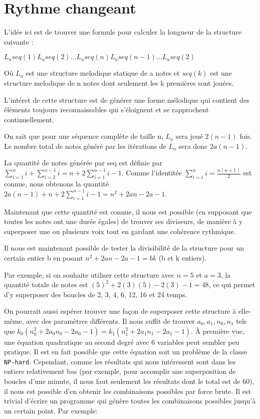 \documentclass{article}
\begin{document}
\section{Rythme changeant}
L'idée ici est de trouver une formule pour calculer la longueur de la structure
suivante :

$L_a seq(1) L_a seq(2) ... L_a seq(n) L_a seq(n-1) ... L_a seq(2)$

Où $L_a$ est une structure melodique statique de a notes et $seq(k)$ est une 
structure melodique de n notes dont seulement les k premières sont jouées.

L'intéret de cette structure est de générer une forme mélodique qui contient
des éléments toujours reconnaissables qui s'éloignent et se rapprochent
continuellement. 

On sait que pour une séquence complète de taille n, $L_a$ sera joué $2(n-1)$ fois.
Le nombre total de notes généré par les itérations de $L_a$ sera donc $2a(n-1)$.

La quantité de notes générée par seq est définie par 
$\sum\limits_{i=1}^n i + \sum\limits_{i=2}^{n-1} i = n + 2\sum\limits_{i=1}^{n-1} i - 1$.
Comme l'identitée $\sum\limits_{i=1}^n i = \frac{n(n+1)}{2}$ est connue, nous
obtenons la quantité $2a(n-1) + n + 2\sum\limits_{i=1}^{n-1} i - 1= n^2 +2an - 2a - 1$.

Maintenant que cette quantité est connue, il  nous est possible (en supposant 
que toutes les notes ont une durée égales) de trouver ses diviseurs, de manière
à y superposer une ou plusieurs voix tout en gardant une cohérence rythmique.

Il nous est maintenant possible de tester la divisibilité de la structure pour
un certain entier b en posant $n^2 + 2an - 2a - 1 = bk$ (b et k entiers). 

Par exemple, si on souhaite utiliser cette structure avec $n=5$ et $a=3$, la
quantité totale de notes est $(5)^2 + 2(3)(5) - 2(3) - 1 = 48$, ce qui permet
d'y superposer des boucles de 2, 3, 4, 6, 12, 16 et 24 temps. 

On pourrait aussi espérer trouver une façon de superposer cette structure à 
elle-même, avec des paramètres différents. Il nous suffit de trouver
$a_0, a_1, n_0, n_1$ tels que 
$k_0(n_0^2 + 2 a_0 n_0 - 2 a_0 - 1) = k_1(n_1^2 + 2 a_1 n_1 - 2 a_1 - 1)$. À
première vue, une équation quadratique au second degré avec 6 variables peut 
sembler peu pratique. Il est en fait possible que cette équation soit un
problème de la classe \texttt{NP-hard}. Cependant, comme les résultats qui
nous intéressent sont dans les entiers relativement bas (par exemple, pour
accomplir une superposition de boucles d'une minute, il nous faut seulement les
résultats dont le total est de 60), il nous est possible d'en obtenir les 
combinaisons possibles par force brute. Il est trivial d'écrire un programme
qui génère toutes les combinaisons possibles jusqu'à un certain point.
Par exemple:
\end{document}
